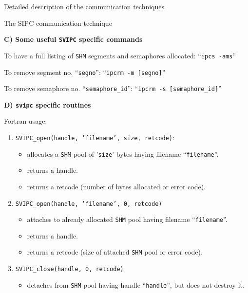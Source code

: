 \begin{section}{Detailed description of the communication techniques}
\begin{subsection}{The SIPC communication technique}
\vspace{.6truecm}

{\bf C) Some useful {\tt SVIPC} specific commands}

\vspace{.3truecm}

To have a full listing of {\tt SHM} segments and semaphores allocated: ``{\tt ipcs -ams}''


To remove segment no. ``{\tt segno}'': ``{\tt ipcrm -m [segno]}''

To remove semaphore no. ``{\tt semaphore\_id}'': ``{\tt ipcrm -s [semaphore\_id]}''

\vspace{.6truecm}

{\bf D) {\tt svipc} specific routines}

\vspace{.3truecm}

Fortran usage:
\begin{enumerate}
 
\item {\tt SVIPC\_open(handle, 'filename', size, retcode)}:

  \begin{itemize}
    \item allocates a {\tt SHM} pool of '{\tt size}' bytes having filename ``{\tt filename}''.
    \item returns a handle. 
    \item returns a retcode (number of bytes allocated or error code).
  \end{itemize}

\item {\tt SVIPC\_open(handle, 'filename', 0, retcode)}
  
  \begin{itemize}
    \item attaches to already allocated {\tt SHM} pool having filename ``{\tt filename}''.
    \item returns a handle.
    \item returns a retcode (size of attached {\tt SHM} pool or error code).
  \end{itemize}

\item {\tt SVIPC\_close(handle, 0, retcode)}

  \begin{itemize}
    \item detaches from {\tt SHM} pool having handle ``{\tt handle}'', but does not
destroy it.
 \end{itemize}


\end{enumerate}
\end{subsection}
\end{section}
